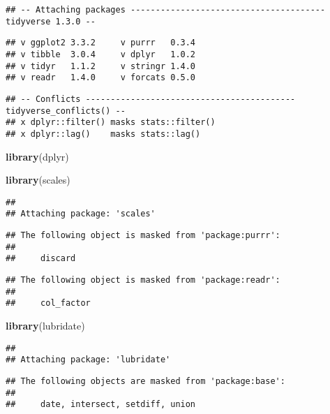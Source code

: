 \documentclass[
]{article}
\newenvironment{Shaded}{\begin{snugshade}}{\end{snugshade}}
\newcommand{\KeywordTok}[1]{\textcolor[rgb]{0.13,0.29,0.53}{\textbf{#1}}}
\newcommand{\NormalTok}[1]{#1}
\begin{document}
\begin{verbatim}
## -- Attaching packages --------------------------------------- tidyverse 1.3.0 --
\end{verbatim}

\begin{verbatim}
## v ggplot2 3.3.2     v purrr   0.3.4
## v tibble  3.0.4     v dplyr   1.0.2
## v tidyr   1.1.2     v stringr 1.4.0
## v readr   1.4.0     v forcats 0.5.0
\end{verbatim}

\begin{verbatim}
## -- Conflicts ------------------------------------------ tidyverse_conflicts() --
## x dplyr::filter() masks stats::filter()
## x dplyr::lag()    masks stats::lag()
\end{verbatim}

\begin{Shaded}
\begin{Highlighting}[]
\KeywordTok{library}\NormalTok{(dplyr)}

\KeywordTok{library}\NormalTok{(scales) }
\end{Highlighting}
\end{Shaded}

\begin{verbatim}
## 
## Attaching package: 'scales'
\end{verbatim}

\begin{verbatim}
## The following object is masked from 'package:purrr':
## 
##     discard
\end{verbatim}

\begin{verbatim}
## The following object is masked from 'package:readr':
## 
##     col_factor
\end{verbatim}

\begin{Shaded}
\begin{Highlighting}[]
\KeywordTok{library}\NormalTok{(lubridate)}
\end{Highlighting}
\end{Shaded}

\begin{verbatim}
## 
## Attaching package: 'lubridate'
\end{verbatim}

\begin{verbatim}
## The following objects are masked from 'package:base':
## 
##     date, intersect, setdiff, union
\end{verbatim}
\end{document}
